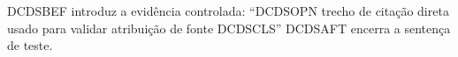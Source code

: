 \documentclass{abntexto-ufc}
\begin{document}
\textual

\noindent DCDSBEF introduz a evidência controlada: \enquote{DCDSOPN trecho de citação direta usado para validar atribuição de fonte DCDSCLS} \cite[103]{oliveira2011} DCDSAFT encerra a sentença de teste.
\end{document}
